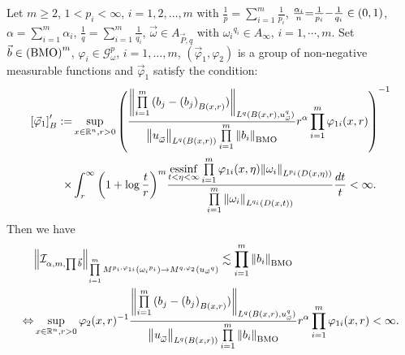 \documentclass[11pt, twoside, leqno]{article}
\begin{document}
\begin{thm}\label{CCFRI1}
	Let $m\geq 2$, $1< p_i<\infty$, $i=1,2,\ldots,m$ with $\frac{1}{p} = \sum\limits_{i = 1}^m {\frac{1}{{{p_i}}}}$, $\frac{{{\alpha _i}}}{n}{\rm{ = }}\frac{1}{{{p_i}}}{\rm{ - }}\frac{1}{{{q_i}}} \in (0,1)$, $\alpha  = \sum\limits_{i = 1}^m {{\alpha _i}}$, $\frac{1}{q} = \sum\limits_{i = 1}^m {\frac{1}{{{q_i}}}}$, $\vec{\omega}\in {A_{\vec P,q}}$ with ${\omega _i}^{{q_i}} \in {A_\infty }$, $i = 1, \cdots ,m$. Set $\vec b \in {\left( {\rm BMO} \right)^m}$, ${\varphi _i} \in \mathcal{G}_\omega ^p$, $i = 1, \ldots ,m$, $({{\vec \varphi }_1},{\varphi _2})$ is a group of non-negative measurable functions and ${{\vec \varphi }_1}$ satisfy the condition:
	\begin{align}
	\left[ {{{\vec \varphi }_1}} \right]_B^{\prime }: =& \mathop {\sup }\limits_{x \in {{\mathbb R^n}},r > 0} {\left( {\frac{{{{\left\| {\prod\limits_{i = 1}^m {({b_j} - {{({b_j})}_{B(x,r)}})} } \right\|}_{{L^q}{{(B(x,r),u_{\vec \omega }^q)}}}}}}{{{{\left\| {u_{\vec \omega }^{}} \right\|}_{{L^q}(B(x,r))}}\prod\limits_{i = 1}^m {{{\left\| {{b_i}} \right\|}_{\rm BMO}}} }}{r^\alpha }\prod\limits_{i = 1}^m {{\varphi _{1i}}(x,r)} } \right)^{ - 1}}\notag\\
	\times& \int_r^\infty  {{{\left( {1 + \log \frac{t}{r}} \right)}^m}\frac{{\mathop {{\rm{essinf}}}\limits_{t < \eta  < \infty } \prod\limits_{i = 1}^m {{\varphi _{1i}}(x,\eta ){{\left\| {{\omega _i}} \right\|}_{{L^{{p_i}}}(D(x,\eta ))}}} }}{{\prod\limits_{i = 1}^m {{{\left\| {{\omega _i}} \right\|}_{{L^{{q_i}}}(D(x,t))}}} }}\frac{{dt}}{t}}  < \infty.
	\end{align}
	Then we have
	\begin{align}
	&{\left\| {\mathcal{I}_{\alpha,m,\prod \vec b }} \right\|_{\prod\limits_{i = 1}^m {{M^{{p_i},{\varphi _{1i}}}}\left( {{\omega _i}^{{p_i}}} \right)}  \to {M^{q,{\varphi _2}}}\left( {{u_{\vec \omega }}^q} \right)}} \lesssim \prod\limits_{i = 1}^m {{{\left\| {{b_i}} \right\|}_{\rm BMO}}}\notag\\
	\Leftrightarrow& \mathop {\sup }\limits_{x \in {{\mathbb R^n}},r > 0} {\varphi _2}{(x,r)^{ - 1}}\frac{{{{\left\| {\prod\limits_{i = 1}^m {({b_j} - {{({b_j})}_{B(x,r)}})} } \right\|}_{{L^q}{(B(x,r),u_{\vec \omega }^q)}}}}}{{{{\left\| {u_{\vec \omega }^{}} \right\|}_{{L^q}(B(x,r))}}\prod\limits_{i = 1}^m {{{\left\| {{b_i}} \right\|}_{\rm BMO}}} }}{r^\alpha }\prod\limits_{i = 1}^m {{\varphi _{1i}}(x,r)}  < \infty.
	\end{align}
\end{thm}
\end{document}

